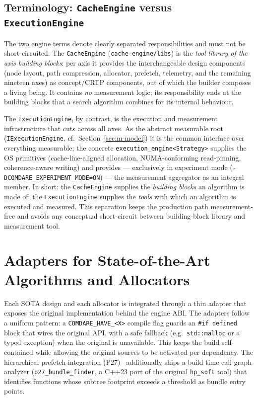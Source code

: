 \subsection{Terminology: \texttt{CacheEngine} versus \texttt{ExecutionEngine}}\label{sec:terminologie-engines}

The two engine terms denote clearly separated responsibilities and must not be short-circuited. The
\texttt{CacheEngine} (\texttt{cache-engine/libs}) is the
\emph{tool library of the axis building blocks}: per axis it provides the interchangeable design
components (node layout, path compression, allocator, prefetch, telemetry, and the remaining
nineteen axes) as concept/CRTP components, out of which the builder composes a living being. It
contains \emph{no} measurement logic; its responsibility ends at the building blocks that a search
algorithm combines for its internal behaviour.

The \texttt{ExecutionEngine}, by contrast, is the execution and measurement infrastructure that cuts
across all axes. As the abstract measurable root (\texttt{IExecutionEngine},
cf.\ Section~\ref{sec:m-model}) it is the common interface over everything measurable; the concrete
\texttt{execution\_engine<Strategy>} supplies the OS primitives (cache-line-aligned allocation,
NUMA-conforming read-pinning, coherence-aware writing) and provides --- exclusively in experiment
mode (\texttt{-DCOMDARE\_\allowbreak{}EXPERIMENT\_\allowbreak{}MODE=ON}) --- the measurement
aggregator as an integral member. In short: the \texttt{CacheEngine} supplies the
\emph{building blocks} an algorithm is made of; the \texttt{ExecutionEngine} supplies the
\emph{tools} with which an algorithm is executed and measured. This separation keeps the production
path measurement-free and avoids any conceptual short-circuit between building-block library and
measurement tool.

\section{Adapters for State-of-the-Art Algorithms and Allocators}\label{sec:adapters}

Each SOTA design and each allocator is integrated through a thin adapter that exposes the original
implementation behind the engine ABI\@. The adapters follow a uniform pattern: a
\texttt{COMDARE\_HAVE\_<X>} compile flag guards an \texttt{\#if defined} block that wires the
original API, with a safe fallback (e.g.\ \texttt{std::malloc} or a typed exception) when the
original is unavailable. This keeps the build self-contained while allowing the original sources to
be activated per dependency. The hierarchical-prefetch integration
(P27)~\cite{zhang2025hierarchical} additionally ships a build-time call-graph analyzer
(\texttt{p27\_bundle\_finder}, a C++23 port of the original \texttt{hp\_soft} tool) that identifies
functions whose subtree footprint exceeds a threshold as bundle entry points.

